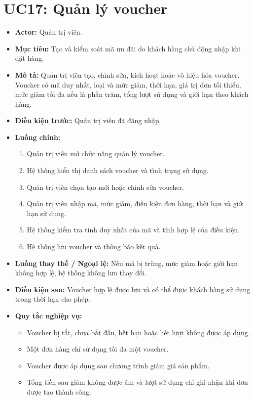 \section{UC17: Quản lý voucher}
\begin{itemize}
    \item \textbf{Actor:} Quản trị viên.
    \item \textbf{Mục tiêu:} Tạo và kiểm soát mã ưu đãi do khách hàng chủ động nhập khi đặt hàng.
    \item \textbf{Mô tả:} Quản trị viên tạo, chỉnh sửa, kích hoạt hoặc vô hiệu hóa voucher. Voucher có mã duy nhất, loại và mức giảm, thời hạn, giá trị đơn tối thiểu, mức giảm tối đa nếu là phần trăm, tổng lượt sử dụng và giới hạn theo khách hàng.
    \item \textbf{Điều kiện trước:} Quản trị viên đã đăng nhập.
    \item \textbf{Luồng chính:}
    \begin{enumerate}
        \item Quản trị viên mở chức năng quản lý voucher.
        \item Hệ thống hiển thị danh sách voucher và tình trạng sử dụng.
        \item Quản trị viên chọn tạo mới hoặc chỉnh sửa voucher.
        \item Quản trị viên nhập mã, mức giảm, điều kiện đơn hàng, thời hạn và giới hạn sử dụng.
        \item Hệ thống kiểm tra tính duy nhất của mã và tính hợp lệ của điều kiện.
        \item Hệ thống lưu voucher và thông báo kết quả.
    \end{enumerate}
    \item \textbf{Luồng thay thế / Ngoại lệ:} Nếu mã bị trùng, mức giảm hoặc giới hạn không hợp lệ, hệ thống không lưu thay đổi.
    \item \textbf{Điều kiện sau:} Voucher hợp lệ được lưu và có thể được khách hàng sử dụng trong thời hạn cho phép.
    \item \textbf{Quy tắc nghiệp vụ:}
    \begin{itemize}
        \item Voucher bị tắt, chưa bắt đầu, hết hạn hoặc hết lượt không được áp dụng.
        \item Một đơn hàng chỉ sử dụng tối đa một voucher.
        \item Voucher được áp dụng sau chương trình giảm giá sản phẩm.
        \item Tổng tiền sau giảm không được âm và lượt sử dụng chỉ ghi nhận khi đơn được tạo thành công.
    \end{itemize}
\end{itemize}

